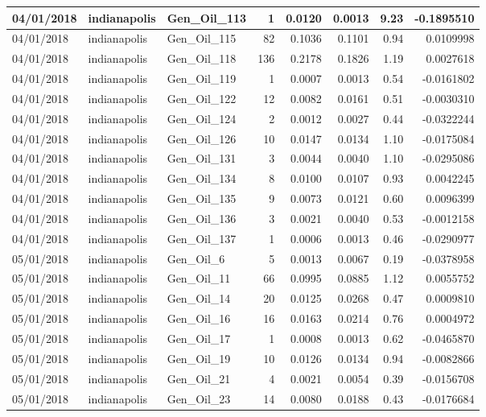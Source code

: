 \documentclass[
  letterpaper,
  DIV=11,
  numbers=noendperiod]{scrartcl}
\begin{document}
\begin{tabular}{l|l|l|r|r|r|r|r}
\hline
04/01/2018 & indianapolis & Gen\_Oil\_113 & 1 & 0.0120 & 0.0013 & 9.23 & -0.1895510\\
\hline
04/01/2018 & indianapolis & Gen\_Oil\_115 & 82 & 0.1036 & 0.1101 & 0.94 & 0.0109998\\
\hline
04/01/2018 & indianapolis & Gen\_Oil\_118 & 136 & 0.2178 & 0.1826 & 1.19 & 0.0027618\\
\hline
04/01/2018 & indianapolis & Gen\_Oil\_119 & 1 & 0.0007 & 0.0013 & 0.54 & -0.0161802\\
\hline
04/01/2018 & indianapolis & Gen\_Oil\_122 & 12 & 0.0082 & 0.0161 & 0.51 & -0.0030310\\
\hline
04/01/2018 & indianapolis & Gen\_Oil\_124 & 2 & 0.0012 & 0.0027 & 0.44 & -0.0322244\\
\hline
04/01/2018 & indianapolis & Gen\_Oil\_126 & 10 & 0.0147 & 0.0134 & 1.10 & -0.0175084\\
\hline
04/01/2018 & indianapolis & Gen\_Oil\_131 & 3 & 0.0044 & 0.0040 & 1.10 & -0.0295086\\
\hline
04/01/2018 & indianapolis & Gen\_Oil\_134 & 8 & 0.0100 & 0.0107 & 0.93 & 0.0042245\\
\hline
04/01/2018 & indianapolis & Gen\_Oil\_135 & 9 & 0.0073 & 0.0121 & 0.60 & 0.0096399\\
\hline
04/01/2018 & indianapolis & Gen\_Oil\_136 & 3 & 0.0021 & 0.0040 & 0.53 & -0.0012158\\
\hline
04/01/2018 & indianapolis & Gen\_Oil\_137 & 1 & 0.0006 & 0.0013 & 0.46 & -0.0290977\\
\hline
05/01/2018 & indianapolis & Gen\_Oil\_6 & 5 & 0.0013 & 0.0067 & 0.19 & -0.0378958\\
\hline
05/01/2018 & indianapolis & Gen\_Oil\_11 & 66 & 0.0995 & 0.0885 & 1.12 & 0.0055752\\
\hline
05/01/2018 & indianapolis & Gen\_Oil\_14 & 20 & 0.0125 & 0.0268 & 0.47 & 0.0009810\\
\hline
05/01/2018 & indianapolis & Gen\_Oil\_16 & 16 & 0.0163 & 0.0214 & 0.76 & 0.0004972\\
\hline
05/01/2018 & indianapolis & Gen\_Oil\_17 & 1 & 0.0008 & 0.0013 & 0.62 & -0.0465870\\
\hline
05/01/2018 & indianapolis & Gen\_Oil\_19 & 10 & 0.0126 & 0.0134 & 0.94 & -0.0082866\\
\hline
05/01/2018 & indianapolis & Gen\_Oil\_21 & 4 & 0.0021 & 0.0054 & 0.39 & -0.0156708\\
\hline
05/01/2018 & indianapolis & Gen\_Oil\_23 & 14 & 0.0080 & 0.0188 & 0.43 & -0.0176684\\

\end{tabular}
\end{document}
